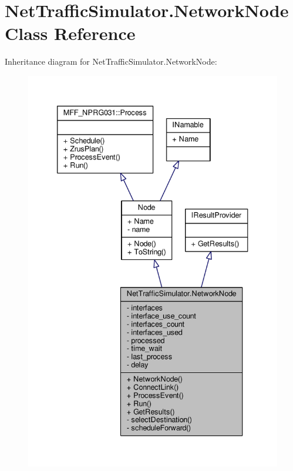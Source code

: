 \hypertarget{classNetTrafficSimulator_1_1NetworkNode}{\section{Net\-Traffic\-Simulator.\-Network\-Node Class Reference}
\label{classNetTrafficSimulator_1_1NetworkNode}
}


Inheritance diagram for Net\-Traffic\-Simulator.\-Network\-Node\-:
\nopagebreak
\begin{figure}[H]
\begin{center}
\leavevmode
\includegraphics[width=336pt]{classNetTrafficSimulator_1_1NetworkNode__inherit__graph}
\end{center}
\end{figure}



